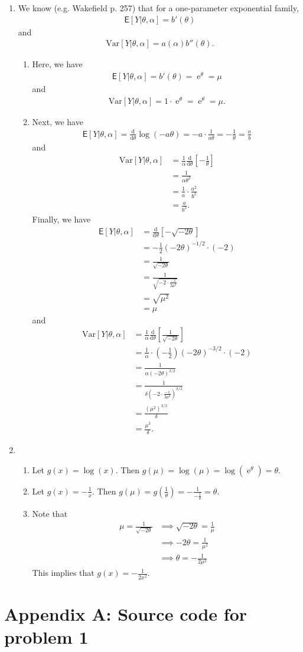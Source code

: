 \documentclass[11pt]{article}
\newcommand*\ba{\[ \begin{aligned}}
\newcommand*\ea{\end{aligned} \]}
\newcommand*\E[1]{\mathsf{E}\left[#1\right]}
\newcommand*\Var[1]{\text{Var}\left[#1\right]}
\newcommand*\der{\text{d}}
\newcommand*\deriv[2]{\frac{\der #1}{\der #2}}
\newcommand\e{\operatorname{e}}
\renewcommand\;{\,}
\begin{document}
\begin{enumerate}[label=(\alph*)]
\item
We know (e.g. Wakefield p. 257) that for a one-parameter exponential family,
\ba
\E{Y | \theta, \alpha} = b'(\theta)
\ea
and
\ba
\Var{Y | \theta, \alpha} = a(\alpha) b''(\theta).
\ea
\begin{enumerate}[label=(\roman*)]
\item
Here, we have
\ba
\E{Y | \theta, \alpha} = b'(\theta) = \boxed{\e^\theta} = \mu
\ea
and
\ba
\Var{Y | \theta, \alpha} = 1 \cdot \e^\theta = \boxed{\e^\theta} = \mu.
\ea
\item
Next, we have
\ba
\E{Y | \theta, \alpha } = \deriv{}{\theta} \log(-a\theta) = - a \cdot \frac{1}{a \theta} = \boxed{ - \frac{1}{\theta} } = \frac{a}{b}
\ea
and
\ba
\Var{Y | \theta, \alpha} & = \frac{1}{\alpha} \deriv{}{\theta}\left[-\frac{1}{\theta}\right] \\
	& = \boxed{ \frac{1}{\alpha \theta^2} } \\
	& = \frac{1}{a} \cdot \frac{a^2}{b^2} \\
	& = \frac{a}{b^2}.
\ea
Finally, we have
\ba
\E{Y|\theta, \alpha} & = \deriv{}{\theta} \left[ -\sqrt{-2\theta} \right] \\
	& = - \frac{1}{2} (-2\theta)^{-1/2} \cdot (-2) \\
	& = \boxed{ \frac{1}{\sqrt{-2\theta}} } \\
	& = \frac{1}{\sqrt{-2 \cdot \frac{-1}{2\mu^2} } } \\
	& = \sqrt{\mu^2} \\
	& = \mu
\ea
and
\ba
\Var{Y|\theta, \alpha} & = \frac{1}{\alpha} \deriv{}{\theta} \left[ \frac{1}{\sqrt{-2\theta}} \right] \\
	& = \frac{1}{\alpha} \cdot \left(-\frac{1}{2}\right) (-2\theta)^{-3/2} \cdot (-2) \\
	& = \boxed{ \frac{1}{ \alpha (-2\theta)^{3/2}  } } \\
	& = \frac{1}{ \delta \left(-2 \cdot \frac{-1}{2\mu^2} \right)^{3/2} } \\
	& = \frac{(\mu^2)^{3/2}}{\delta} \\
	& = \frac{\mu^3}{\delta}. 
\ea
\end{enumerate}
\item
\begin{enumerate}[label=(\roman*)]
\item
Let $\boxed{g(x) = \log(x)}$. Then $g(\mu) = \log(\mu) = \log(\e^\theta) = \theta$.
\item
Let $\boxed{g(x) = - \frac{1}{x} }$. Then $g(\mu) = g\left(\frac{1}{\theta}\right) = -\frac{1}{-\frac{1}{\theta}} = \theta$.  
\item
Note that
\ba
\mu = \frac{1}{\sqrt{-2\theta}} & \implies \sqrt{-2\theta} = \frac{1}{\mu} \\
	& \implies -2 \theta = \frac{1}{\mu^2} \\
	& \implies \theta = - \frac{1}{2\mu^2}
\ea
This implies that $\boxed{ g(x) = - \frac{1}{2x^2} }$. 
\end{enumerate}
\end{enumerate}

\newpage
\section*{Appendix A: Source code for problem 1}

\end{document}
